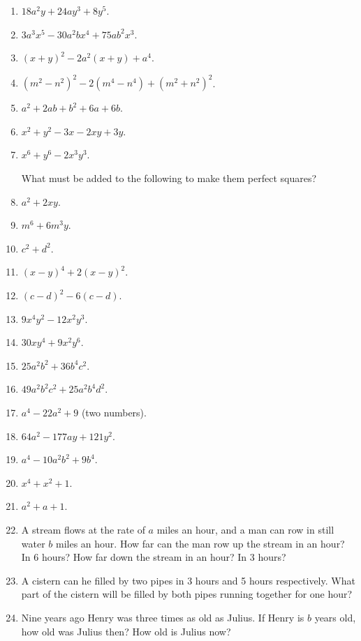\documentclass{book}
\begin{document}
\begin{enumerate}
\item $18a^2y + 24ay^3 + 8y^5$.

\item $3a^3x^5 - 30a^2bx^4 + 75ab^2x^3$.

\item $(x+y)^2 - 2a^2(x+y) + a^4$.

\item $(m^2 - n^2)^2 - 2(m^4 - n^4) + (m^2 + n^2)^2$.

\item $a^2 + 2ab + b^2 + 6a + 6b$.

\item $x^2 + y^2 - 3x - 2xy + 3y$.

\item $x^6 + y^6 - 2x^3y^3$.

What must be added to the following to make them
perfect squares?

\item $a^2 + 2xy$.

\item $m^6 + 6m^3y$.

\item $c^2 + d^2$.

\item $(x - y)^4 + 2(x - y)^2$.

\item $(c - d)^2 - 6(c -d )$.

\item $9x^4y^2 - 12x^2y^3$.

\item $30xy^4 + 9x^2y^6$.

\item $25a^2b^2 + 36b^4c^2$.

\item $49a^2b^2c^2 + 25a^2b^4d^2$.

\item $a^4 - 22a^2 + 9$ (two numbers).

\item $64a^2 - 177ay + 121y^2$.

\item $a^4 - 10a^2b^2 + 9b^4$.

\item $x^4 + x^2 + 1$.

\item $a^2 + a + 1$.

\item A stream flows at the rate of $a$ miles an hour, and a man
can row in still water $b$ miles an hour. How far can the man row
up the stream in an hour? In 6 hours? How far down the stream in
an hour? In 3 hours?

\item A cistern can he filled by two pipes in 3 hours and 5 hours
respectively. What part of the cistern will be filled by both
pipes running together for one hour?

\item Nine years ago Henry was three times as old as Julius. If
Henry is $b$ years old, how old was Julius then? How old is Julius
now?
\end{enumerate}
\end{document}
